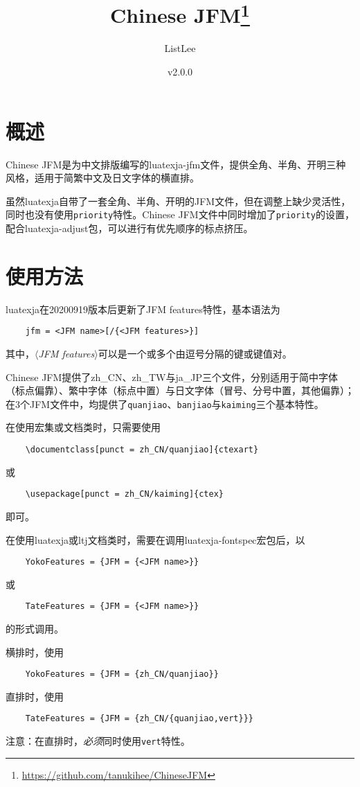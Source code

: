 \documentclass[a4paper , zihao=-4 , punct=zh_CN/kaiming]{ctexart}
\title{\textbf{\textsf{Chinese JFM}}\thanks{\url{https://github.com/tanukihee/ChineseJFM}}}
\author{ListLee}
\date{\zhtoday \qquad v2.0.0}
\begin{document}
\maketitle

\section{概述}
\textsf{Chinese JFM}是为中文排版编写的luatexja-jfm文件，提供全角、半角、开明三种风格，适用于简繁中文及日文字体的横直排。

虽然\textsf{luatexja}自带了一套全角、半角、开明的JFM文件，但在调整上缺少灵活性，同时也没有使用\+\verb|priority|特性。\textsf{Chinese JFM}文件中同时增加了\+\verb|priority|的设置，配合\textsf{luatexja-adjust}包，可以进行有优先顺序的标点挤压。\label{sec:pr}

\section{使用方法}
\textsf{luatexja}在20200919版本后更新了JFM features特性，基本语法为
\begin{verbatim}
    jfm = <JFM name>[/{<JFM features>}]
\end{verbatim}
其中，\(\langle\)\textit{JFM features}\(\rangle\)可以是一个或多个由逗号分隔的键或键值对。

\textsf{Chinese JFM}提供了\textsf{zh\_CN}、\textsf{zh\_TW}与\textsf{ja\_JP}三个文件，分别适用于简中字体（标点偏靠）、繁中字体（标点中置）与日文字体（冒号、分号中置，其他偏靠）；在3个JFM文件中，均提供了\+\verb|quanjiao|、\verb|banjiao|与\+\verb|kaiming|三个基本特性。

在使用\CTeX{}宏集或文档类时，只需要使用
\begin{verbatim}
    \documentclass[punct = zh_CN/quanjiao]{ctexart}
\end{verbatim}
或
\begin{verbatim}
    \usepackage[punct = zh_CN/kaiming]{ctex}
\end{verbatim}
即可。

在使用\textsf{luatexja}或\textsf{ltj}文档类时，需要在调用\textsf{luatexja-fontspec}宏包后，以\begin{verbatim}
    YokoFeatures = {JFM = {<JFM name>}}
\end{verbatim}
或
\begin{verbatim}
    TateFeatures = {JFM = {<JFM name>}}
\end{verbatim}
的形式调用。

横排时，使用
\begin{verbatim}
    YokoFeatures = {JFM = {zh_CN/quanjiao}}
\end{verbatim}
直排时，使用
\begin{verbatim}
    TateFeatures = {JFM = {zh_CN/{quanjiao,vert}}}
\end{verbatim}
{\color{red}注意：在直排时，\emph{必须}同时使用\+\verb|vert|特性。}
\end{document}
